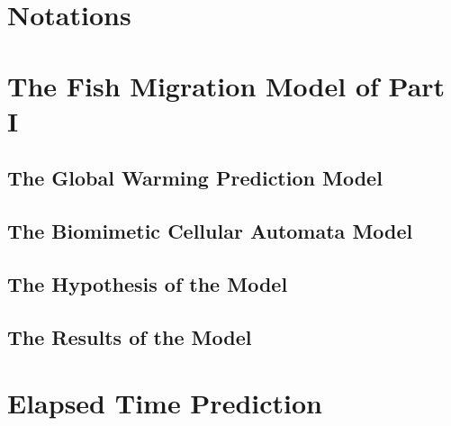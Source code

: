 \documentclass{mcmthesis}
\begin{document}





\section{Notations}


\section{The Fish Migration Model of Part I}
\subsection{The Global Warming Prediction Model}
\subsection{The Biomimetic Cellular Automata Model}
\subsection{The Hypothesis of the Model}
\subsection{The Results of the Model}

\section{Elapsed Time Prediction}
\end{document}
